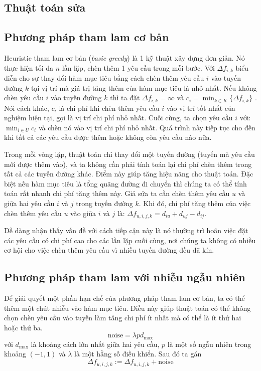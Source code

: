 \subsection{Thuật toán sửa}


\subsection{Phương pháp tham lam cơ bản}
\label{sec:basic_greedy}
Heuristic tham lam cơ bản (\textit{basic greedy}) là 1 kỹ thuật xây dựng đơn giản. Nó thực hiện tối đa $n$ lần lặp, chèn thêm 1 yêu cầu trong mỗi bước. Với $\Delta f_{i, k}$ biểu diễn cho sự thay đổi hàm mục tiêu bằng cách chèn thêm yêu cầu $i$ vào tuyến đường $k$ tại vị trí mà giá trị tăng thêm của hàm mục tiêu là nhỏ nhất. Nếu không chèn yêu cầu $i$ vào tuyến đường $k$ thì ta đặt $\Delta f_{i, k} = \infty$ và $c_i = \min_{k \in K}\{\Delta f_{i, k}\}$ . Nói cách khác, $c_i$ là chi phí khi chèn thêm yêu cầu $i$ vào vị trí tốt nhất của nghiệm hiện tại, gọi là vị trí chi phí nhỏ nhất. Cuối cùng, ta chọn yêu cầu $i$ với: $\min_{i \in U} c_i$ và chèn nó vào vị trí chi phí nhỏ nhất. Quá trình này tiếp tục cho đến khi tất cả các yêu cầu được thêm hoặc không còn yêu cầu nào nữa.

Trong mỗi vòng lặp, thuật toán chỉ thay đổi một tuyến đường (tuyến mà yêu cầu mới được thêm vào), và ta không cần phải tính toán lại chi phí chèn thêm trong tất cả các tuyến đường khác. Điểm này giúp tăng hiệu năng cho thuật toán. Đặc biệt nếu hàm mục tiêu là tổng quãng đường đi chuyển thì chúng ta có thể tính toán rất nhanh chi phí tăng thêm này. Giả sửa ta cần chèn thêm yêu cầu $u$ và giữa hai yêu cầu $i$ và $j$ trong tuyến đường $k$. Khi đó, chi phí tăng thêm của việc chèn thêm yêu cầu $u$ vào giữa $i$ và $j$ là: $\Delta f_{u, i, j, k} = d_{iu} + d_{uj} - d_{ij}$.

Dễ dàng nhận thấy vấn đề với cách tiếp cận này là nó thường trì hoãn việc đặt các yêu cầu có chi phí cao cho các lần lặp cuối cùng, nơi chúng ta không có nhiều cơ hội cho việc chèn thêm yêu cầu vì nhiều tuyến đường đều đã kín. 

\subsection{Phương pháp tham lam với nhiễu ngẫu nhiên}

Để giải quyết một phần hạn chế của phương pháp tham lam cơ bản, ta có thể thêm một chút nhiễu vào hàm mục tiêu. Điều này giúp thuật toán có thể không chọn chèn yêu cầu vào tuyến làm tăng chi phí ít nhất mà có thể là ít thứ hai hoặc thứ ba. 
\begin{equation}
  \text{noise} = \lambda p d_{\text{max}}
\end{equation}
với $d_{\text{max}}$ là khoảng cách lớn nhất giữa hai yêu cầu, $p$ là một số ngẫu nhiên trong khoảng $(-1,1)$ và $\lambda$ là một hằng số điều khiển. Sau đó ta gán
\begin{equation}
  \Delta f_{u, i, j, k} := \Delta f_{u, i, j, k} + \text{noise}
\end{equation}

